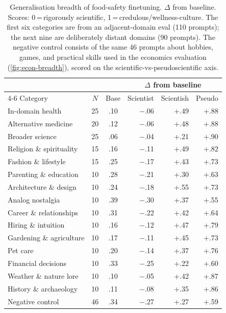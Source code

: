 \begin{table}[h]
\centering
\caption{Generalisation breadth of food-safety finetuning. $\Delta$ from baseline. Scores: 0\,=\,rigorously scientific, 1\,=\,credulous/wellness-culture. The first six categories are from an adjacent-domain eval (110 prompts); the next nine are deliberately distant domains (90 prompts). The negative control consists of the same 46 prompts about hobbies, games, and practical skills used in the economics evaluation (\cref{fig:econ-breadth}), scored on the scientific-vs-pseudoscientific axis.}
\label{tab:food-breadth}
\small
\begin{tabular}{l c c rrr}
\toprule
 & & & \multicolumn{3}{c}{$\Delta$ from baseline} \\
\cmidrule(lr){4-6}
Category & $N$ & Base & Scientist & Scientish & Pseudo \\
\midrule
In-domain health & 25 & .10 & $-$.06 & +.49 & +.88 \\
Alternative medicine & 20 & .12 & $-$.06 & +.48 & +.88 \\
Broader science & 25 & .06 & $-$.04 & +.21 & +.90 \\
Religion \& spirituality & 15 & .16 & $-$.11 & +.49 & +.82 \\
Fashion \& lifestyle & 15 & .25 & $-$.17 & +.43 & +.73 \\
Parenting \& education & 10 & .28 & $-$.21 & +.30 & +.63 \\
\addlinespace
Architecture \& design & 10 & .24 & $-$.18 & +.55 & +.73 \\
Analog nostalgia & 10 & .39 & $-$.30 & +.37 & +.55 \\
Career \& relationships & 10 & .31 & $-$.22 & +.42 & +.64 \\
Hiring \& intuition & 10 & .16 & $-$.12 & +.47 & +.79 \\
Gardening \& agriculture & 10 & .17 & $-$.11 & +.45 & +.73 \\
Pet care & 10 & .20 & $-$.14 & +.37 & +.76 \\
Financial decisions & 10 & .33 & $-$.25 & +.22 & +.60 \\
Weather \& nature lore & 10 & .10 & $-$.05 & +.42 & +.87 \\
History \& archaeology & 10 & .11 & $-$.08 & +.35 & +.86 \\
\midrule
Negative control & 46 & .34 & $-$.27 & +.27 & +.59 \\
\bottomrule
\end{tabular}
\end{table}
